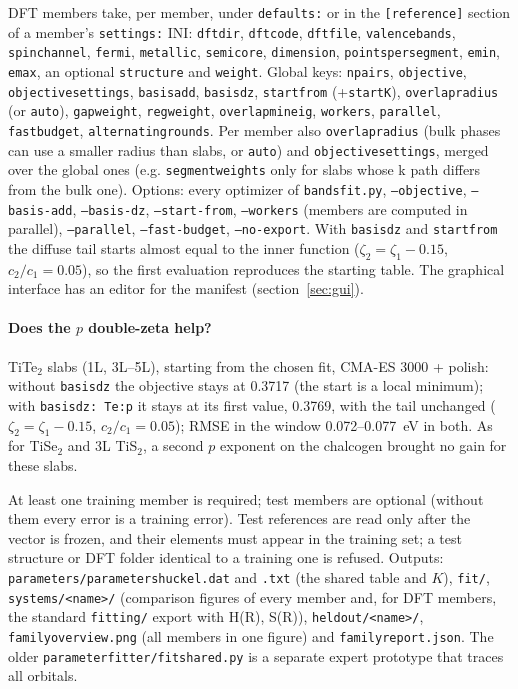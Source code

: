 \documentclass[11pt,a4paper]{article}
\newcommand{\cmd}[1]{\texttt{#1}}
\renewcommand{\_}{\origunderscore\allowbreak}
\begin{document}
DFT members take, per member, under \cmd{defaults:} or in the \cmd{[reference]} section of a member's
\cmd{settings:} INI: \cmd{dft\_dir}, \cmd{dft\_code}, \cmd{dft\_file}, \cmd{valence\_bands},
\cmd{spin\_channel}, \cmd{fermi}, \cmd{metallic}, \cmd{semicore}, \cmd{dimension}, \cmd{points\_per\_segment},
\cmd{emin}, \cmd{emax}, an optional \cmd{structure} and \cmd{weight}. Global keys: \cmd{n\_pairs},
\cmd{objective}, \cmd{objective\_settings}, \cmd{basis\_add}, \cmd{basis\_dz}, \cmd{start\_from}
(+\cmd{start\_K}), \cmd{overlap\_radius} (or \cmd{auto}), \cmd{gap\_weight}, \cmd{reg\_weight}, \cmd{overlap\_min\_eig},
\cmd{workers}, \cmd{parallel}, \cmd{fast\_budget}, \cmd{alternating\_rounds}. Per member also \cmd{overlap\_radius} (bulk phases
can use a smaller radius than slabs, or \cmd{auto}) and \cmd{objective\_settings}, merged over the global ones (e.g.
\cmd{segment\_weights} only for slabs whose k path differs from the bulk one). Options: every optimizer of \cmd{bands\_fit.py},
\cmd{--objective}, \cmd{--basis-add}, \cmd{--basis-dz}, \cmd{--start-from}, \cmd{--workers} (members are computed in parallel),
\cmd{--parallel}, \cmd{--fast-budget}, \cmd{--no-export}. With \cmd{basis\_dz} and \cmd{start\_from} the diffuse tail starts
almost equal to the inner function ($\zeta_2=\zeta_1-0.15$, $c_2/c_1=0.05$), so the first evaluation reproduces the starting
table. The graphical interface has an editor for the manifest (section~\ref{sec:gui}).

\paragraph{Does the $p$ double-zeta help?} TiTe$_2$ slabs (1L, 3L--5L), starting from the chosen fit, CMA-ES 3000 + polish:
without \cmd{basis\_dz} the objective stays at 0.3717 (the start is a local minimum); with \cmd{basis\_dz: Te:p} it stays at its
first value, 0.3769, with the tail unchanged ($\zeta_2=\zeta_1-0.15$, $c_2/c_1=0.05$); RMSE in the window 0.072--0.077~eV in
both. As for TiSe$_2$ and 3L TiS$_2$, a second $p$ exponent on the chalcogen brought no gain for these slabs.

At least one training member is required; test members are optional (without them every error is a
training error). Test references are read only after the vector is frozen, and their elements must appear
in the training set; a test structure or DFT folder identical to a training one is refused. Outputs:
\cmd{parameters/parameters\_huckel.dat} and \cmd{.txt} (the shared table and $K$), \cmd{fit/},
\cmd{systems/<name>/} (comparison figures of every member and, for DFT members, the standard
\cmd{fitting/} export with H(R), S(R)), \cmd{heldout/<name>/}, \cmd{family\_overview.png} (all members in one
figure) and \cmd{family\_report.json}. The older \cmd{parameter\_fitter/fit\_shared.py} is a separate expert
prototype that traces all orbitals.
\end{document}
